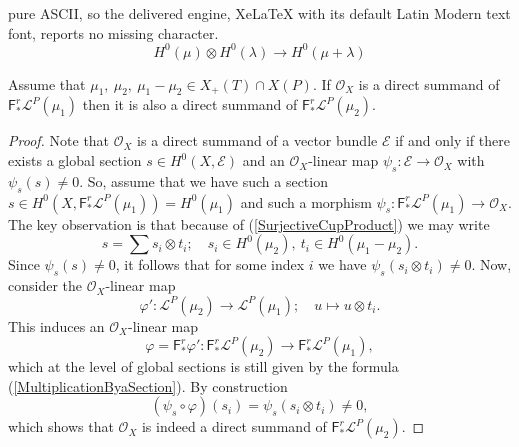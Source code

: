 \documentclass[10pt,a4paper]{amsart}
\newcommand{\Ox}{{\mathscr{O}_{X}}}
\newcommand{\eE}{{\mathscr{E}}}
\begin{document}
pure ASCII, so the delivered engine, XeLaTeX with its default Latin Modern text font, reports no missing character.
\begin{equation}\label{SurjectiveCupProduct}
H^{0}(\mu)\otimes H^{0}(\lambda)\to H^{0}(\mu+\lambda)
\end{equation}

\begin{lem}\label{DominanceSplittingLemma}
Assume that $\mu_{1},\ \mu_{2},\ \mu_{1}-\mu_{2}\in X_{+}(T)\cap X(P)$. If $\Ox$ is a direct summand of $\mathsf{F}^{r}_{*}\mathscr{L}^{P}(\mu_{1})$ then it is also a direct summand of $\mathsf{F}^{r}_{*}\mathscr{L}^{P}(\mu_{2})$.
\end{lem}

\begin{proof}
Note that $\Ox$ is a direct summand of a vector bundle $\eE$ if and only if there exists a global section $s\in H^{0}(X,\eE)$ and an $\Ox$-linear map $\psi_{s}\colon \eE\to \Ox$ with $\psi_{s}(s)\neq0$. So, assume that we have such a section $s\in H^{0}(X,\mathsf{F}^{r}_{*}\mathscr{L}^{P}(\mu_{1}))=H^{0}(\mu_{1})$ and such a morphism $\psi_{s}
\colon\mathsf{F}^{r}_{*}\mathscr{L}^{P}(\mu_{1})\to\Ox$. 
The key observation is that because of (\ref{SurjectiveCupProduct}) we may write
%
\[
s=\sum s_{i}\otimes t_{i};\quad s_{i}\in H^{0}(\mu_{2}),\ t_{i}\in H^{0}(\mu_{1}-\mu_{2}).
\]
%
Since $\psi_{s}(s)\neq 0$, it follows that for some index $i$ we have $\psi_{s}(s_{i}\otimes t_{i})\neq 0$. Now, consider the $\Ox$-linear map
%
\begin{equation}\label{MultiplicationByaSection}
\varphi':\mathscr{L}^{P}(\mu_{2})\to\mathscr{L}^{P}(\mu_{1});\quad u\mapsto u\otimes t_{i}.
\end{equation}
%
This induces an $\Ox$-linear map
%
\[
\varphi=\mathsf{F}^{r}_{*}\varphi':\mathsf{F}^{r}_{*}\mathscr{L}^{P}(\mu_{2})\to\mathsf{F}^{r}_{*}\mathscr{L}^{P}(\mu_{1}),
\]
%
which at the level of global sections is still given by the formula (\ref{MultiplicationByaSection}). By construction
%
\[
(\psi_{s}\circ\varphi)(s_{i})=\psi_{s}(s_{i}\otimes t_{i})\neq 0,
\]
%
which shows that $\Ox$ is indeed a direct summand of $\mathsf{F}^{r}_{*}\mathscr{L}^{P}(\mu_{2})$.
\end{proof}
\end{document}
